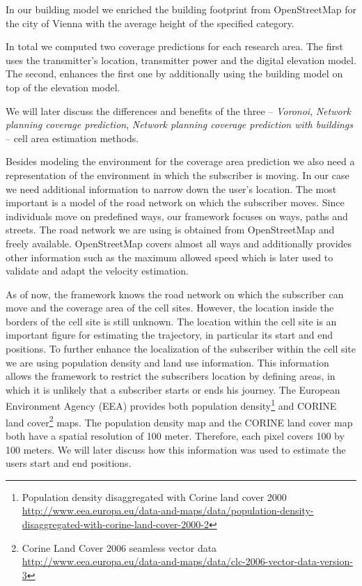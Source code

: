In our building model we enriched the building footprint from OpenStreetMap for the city of Vienna with the average height of the specified category.

In total we computed two coverage predictions for each research area. The first uses the transmitter's location, transmitter power and the digital elevation model. The second, enhances the first one by additionally using the building model on top of the elevation model.

We will later discuss the differences and benefits of the three -- \emph{Voronoi}, \emph{Network planning coverage prediction}, \emph{Network planning coverage prediction with buildings} -- cell area estimation methods.\newline

Besides modeling the environment for the coverage area prediction we also need a representation of the environment in which the subscriber is moving. In our case we need additional information to narrow down the user's location. The most important is a model of the road network on which the subscriber moves. Since individuals move on predefined ways, our framework focuses on ways, paths and streets. The road network we are using is obtained from OpenStreetMap and freely available. OpenStreetMap covers almost all ways and additionally provides other information such as the maximum allowed speed which is later used to validate and adapt the velocity estimation.\newline

As of now, the framework knows the road network on which the subscriber can move and the coverage area of the cell sites. However, the location inside the borders of the cell site is still unknown. The location within the cell site is an important figure for estimating the trajectory, in particular its start and end positions. To further enhance the localization of the subscriber within the cell site we are using population density and land use information. This information allows the framework to restrict the subscribers location by defining areas, in which it is unlikely that a subscriber starts or ends his journey. The European Environment Agency (EEA) provides both population density\footnote{Population density disaggregated with Corine land cover 2000 \url{http://www.eea.europa.eu/data-and-maps/data/population-density-disaggregated-with-corine-land-cover-2000-2}} and CORINE land cover\footnote{Corine Land Cover 2006 seamless vector data \url{http://www.eea.europa.eu/data-and-maps/data/clc-2006-vector-data-version-3}} maps. The population density map and the CORINE land cover map both have a spatial resolution of 100 meter. Therefore, each pixel covers 100 by 100 meters. We will later discuss how this information was used to estimate the users start and end positions.

